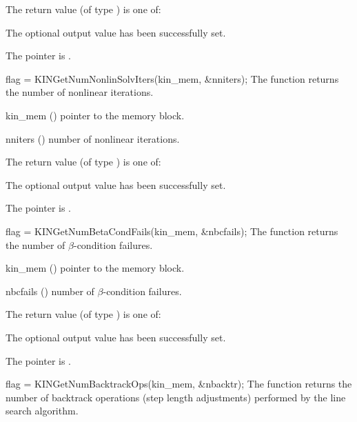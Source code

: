 {
  The return value  (of type ) is one of:
  \begin{args}
  \item[\Id{KIN\_SUCCESS}]
    The optional output value has been successfully set.
  \item[\Id{KIN\_MEM\_NULL}]
    The  pointer is .
  \end{args}
}
{}
{
  flag = KINGetNumNonlinSolvIters(kin\_mem, \&nniters);
}
{
  The function  returns the number
  of nonlinear iterations.
}
{
  \begin{args}
  \item[kin\_mem] ()
    pointer to the {\kinsol} memory block.
  \item[nniters] ()
    number of nonlinear iterations.
  \end{args}
}
{
  The return value  (of type ) is one of:
  \begin{args}
  \item[\Id{KIN\_SUCCESS}]
    The optional output value has been successfully set.
  \item[\Id{KIN\_MEM\_NULL}]
    The  pointer is .
  \end{args}
}
{}
{
  flag = KINGetNumBetaCondFails(kin\_mem, \&nbcfails);
}
{
  The function  returns the number
  of $\beta$-condition failures.
}
{
  \begin{args}[nbcfails]
  \item[kin\_mem] ()
    pointer to the {\kinsol} memory block.
  \item[nbcfails] ()
    number of $\beta$-condition failures.
  \end{args}
}
{
  The return value  (of type ) is one of:
  \begin{args}
  \item[\Id{KIN\_SUCCESS}]
    The optional output value has been successfully set.
  \item[\Id{KIN\_MEM\_NULL}]
    The  pointer is .
  \end{args}
}
{}
{
  flag = KINGetNumBacktrackOps(kin\_mem, \&nbacktr);
}
{
  The function  returns the number of
  backtrack operations (step length adjustments) performed by the
  line search algorithm.
}
